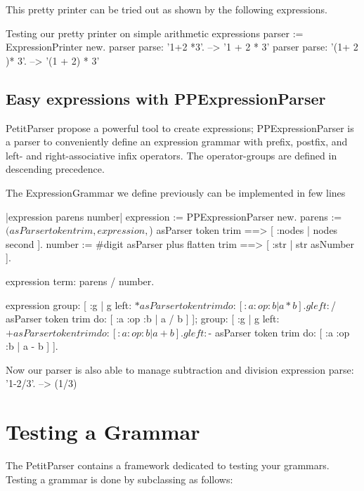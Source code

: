 \documentclass[a4paper,10pt,twoside]{book}
\begin{document}
This pretty printer can be tried out as shown by the following expressions.

\begin{script}{Testing our pretty printer on simple arithmetic expressions}
parser := ExpressionPrinter new.
parser parse: '1+2 *3'.          --> '1 + 2 * 3'
parser parse: '(1+ 2 )* 3'.      --> '(1 + 2) * 3'
\end{script}

\subsection{Easy expressions with PPExpressionParser}

PetitParser propose a powerful tool to create expressions;
PPExpressionParser is a parser to conveniently define an expression
grammar with prefix, postfix, and left- and right-associative infix
operators. The operator-groups are defined in descending precedence. 

\begin{script}{The ExpressionGrammar we define previously can be implemented in few lines}

|expression parens number|
expression := PPExpressionParser new.
parens := $( asParser token trim , expression , $) asParser token trim
==> [ :nodes | nodes second ].
number := #digit asParser plus flatten trim ==> [ :str | str asNumber ].

expression term: parens / number.

expression
group: [ :g |
g left: $* asParser token trim do: [ :a :op :b | a * b ].
g left: $/ asParser token trim do: [ :a :op :b | a / b ] ];
group: [ :g |
g left: $+ asParser token trim do: [ :a :op :b | a + b ].
g left: $- asParser token trim do: [ :a :op :b | a - b ] ].
\end{script}

\begin{script}{Now our parser is also able to manage subtraction and division}
expression parse: '1-2/3'.       --> (1/3)
\end{script}

\section{Testing a Grammar}

The PetitParser contains a framework dedicated to testing your
grammars. Testing a grammar is done by subclassing
 as follows:
\end{document}
